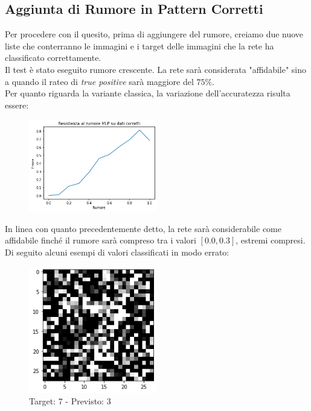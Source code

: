 \documentclass[12pt, a4paper]{article}
\begin{document}
\subsection{Aggiunta di Rumore in Pattern Corretti}
Per procedere con il quesito, prima di aggiungere del rumore, creiamo due nuove liste che conterranno le immagini e i target delle immagini che la rete ha classificato correttamente.\\
Il test è stato eseguito rumore crescente. La rete sarà considerata "affidabile" sino a quando il rateo di \textit{true positive} sarà maggiore del \(75\%\).\\
Per quanto riguarda la variante classica, la variazione dell'accuratezza risulta essere:
\begin{figure}[H]
    \centering
    \includegraphics[width=0.50\textwidth]{TPClassica.png}    
\end{figure}
In linea con quanto precedentemente detto, la rete sarà considerabile come affidabile finché il rumore sarà compreso tra i valori \([0.0, 0.3]\), estremi compresi.\\
Di seguito alcuni esempi di valori classificati in modo errato:
\begin{figure}[H]
    \centering
    \caption{Target: 7 - Previsto: 3}
    \includegraphics[width=0.5\textwidth]{ErrClass1.png}
\end{figure}
\end{document}
